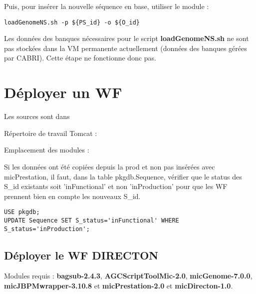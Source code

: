 Puis, pour insérer la nouvelle séquence en base, utiliser le module :
\begin{lstlisting}[style=bash]
loadGenomeNS.sh -p ${PS_id} -o ${O_id}
\end{lstlisting}

\begin{mycolorbox}
	Les données des banques nécessaires pour le script \textbf{loadGenomeNS.sh} ne sont pas stockées dans la VM permanente actuellement (données des banques gérées par CABRI).
	Cette étape ne fonctionne donc pas.
\end{mycolorbox}

\section{Déployer un WF}
Les sources sont dans 
\newline

Répertoire de travail Tomcat : 
\newline

Emplacement des modules : 
\newline

\begin{mycolorbox}
	Si les données ont été copiées depuis la prod et non pas insérées avec micPrestation, il faut, dans la table pkgdb.Sequence, vérifier que le status des S\_id existants soit 'inFunctional' et non 'inProduction' pour que les WF prennent bien en compte les nouveaux S\_id.
\end{mycolorbox}

\begin{lstlisting}[style=SQL]
USE pkgdb;
UPDATE Sequence SET S_status='inFunctional' WHERE S_status='inProduction';
\end{lstlisting}

\subsection{Déployer le WF DIRECTON}
Modules requis : \textbf{bagsub-2.4.3}, \textbf{AGCScriptToolMic-2.0}, \textbf{micGenome-7.0.0}, \textbf{micJBPMwrapper-3.10.8} et \textbf{micPrestation-2.0} et \textbf{micDirecton-1.0}.


